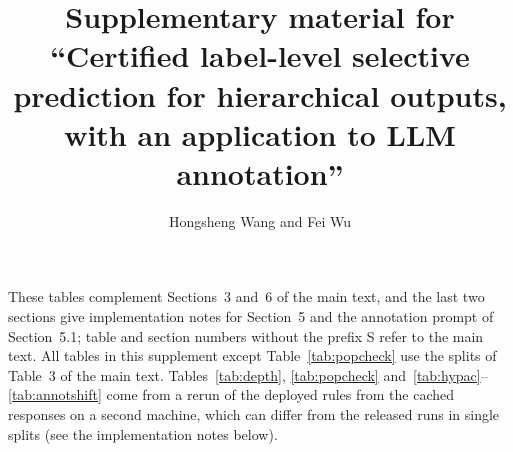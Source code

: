 \documentclass[11pt]{article}
\title{Supplementary material for\\``Certified label-level selective prediction for hierarchical outputs, with an application to LLM annotation''}
\author{Hongsheng Wang and Fei Wu}
\date{}
\newcommand{\hlcl}{\textup{\textsc{HLCL}}}
\begin{document}
\maketitle

These tables complement Sections~3 and~6 of the main text, and the last two
sections give implementation notes for Section~5 and the annotation prompt of
Section~5.1; table and section numbers without
the prefix S refer to the main text. All tables in this
supplement except Table~\ref{tab:popcheck} use the splits of
Table~3 of the main text. Tables~\ref{tab:depth}, \ref{tab:popcheck}
and~\ref{tab:hypac}--\ref{tab:annotshift} come from a rerun of the deployed rules
from the cached responses on a second machine, which can differ
from the released runs in single splits (see the implementation notes below).

\begin{table}[H]
\centering
\footnotesize
\caption{Error and power of \hlcl{} by depth, mean over 100 splits. $q_d/\alpha$
is the error among the labels accepted at depth $d$ divided by $\alpha$ (--: no
acceptance at that depth); power is the share of correct labels of each depth
that are accepted; stored is the error of all stored labels when a reviewer keeps
the accepted prefix and completes the path, divided by $\alpha$. $q_d$ is
averaged over the splits with at least one acceptance at depth $d$ and is noisy
where power is near zero.}
\label{tab:depth}

\end{table}

\begin{table}[H]
\centering
\footnotesize
\caption{Direct check of the guarantee. The 3,000 items of each setting are
treated as the population; in each of 100 draws, fit and calibration samples are
drawn from them with replacement, and the exact mFDR of the deployed rule is
computed on all 3,000 items. The table gives the share of draws in which it
exceeds $\alpha$; for \hlcl{}, Item-cert.\ (automatic test choice) and
Per-field, the guarantee requires at most $\delta=10\%$.}
\label{tab:popcheck}

\end{table}

\begin{table}[H]
\centering
\footnotesize
\setlength{\tabcolsep}{3pt}
\caption{Mean realized label-level error divided by $\alpha$ over 100 splits.
All methods are compared at the same nominal $\alpha$, but they use the error
budget to different degrees.}
\label{tab:realized}

\end{table}
\end{document}
